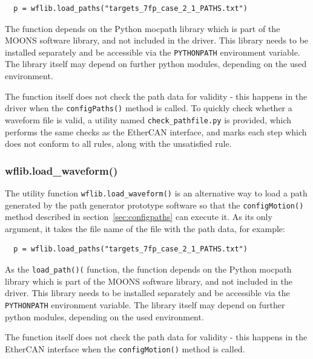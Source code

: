 \documentclass[11pt,a4paper]{report}
\begin{document}
\begin{verbatim}
  p = wflib.load_paths("targets_7fp_case_2_1_PATHS.txt")
\end{verbatim}

The function depends on the Python mocpath library which is part of
the MOONS software library, and not included in the driver.  This
library needs to be installed separately and be accessible via the
\texttt{PYTHONPATH} environment variable. The library itself may
depend on further python modules, depending on the used environment.

%

The function itself does not check the path data for validity - this
happens in the driver when the \texttt{configPaths()} method is
called. To quickly check whether a waveform file is valid, a utility
named \texttt{check\_pathfile.py} is provided, which performs the same
checks as the EtherCAN interface, and marks each step which does not conform to
all rules, along with the unsatisfied rule.


\subsubsection{wflib.load\_waveform()}
%
%
%
The utility function \texttt{wflib.load\_waveform()} is an alternative
way to load a path generated by the path generator prototype software
so that the \texttt{configMotion()} method described in
section~\ref{sec:configpaths} can execute it. As its only argument, it
takes the file name of the file with the path data, for example:

\begin{verbatim}
  p = wflib.load_paths("targets_7fp_case_2_1_PATHS.txt")
\end{verbatim}

As the \texttt{load\_path()(} function, the function depends on the
Python mocpath library which is part of the MOONS software library,
and not included in the driver.  This library needs to be installed
separately and be accessible via the \texttt{PYTHONPATH} environment
variable. The library itself may depend on further python modules,
depending on the used environment.

The function itself does not check the path data for validity - this
happens in the EtherCAN interface when the \texttt{configMotion()} method is
called.
\end{document}
